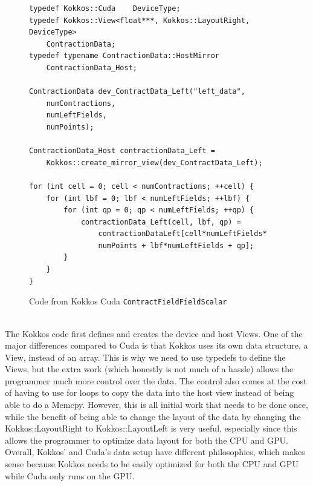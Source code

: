 \begin{figure}[!htb]
	\begin{lstlisting}
typedef Kokkos::Cuda	DeviceType;
typedef Kokkos::View<float***, Kokkos::LayoutRight, DeviceType>
	ContractionData;
typedef typename ContractionData::HostMirror
	ContractionData_Host;

ContractionData dev_ContractData_Left("left_data",
	numContractions,
	numLeftFields,
	numPoints);

ContractionData_Host contractionData_Left = 
	Kokkos::create_mirror_view(dev_ContractData_Left);

for (int cell = 0; cell < numContractions; ++cell) {
	for (int lbf = 0; lbf < numLeftFields; ++lbf) {
		for (int qp = 0; qp < numLeftFields; ++qp) {
			contractionData_Left(cell, lbf, qp) = 
				contractionDataLeft[cell*numLeftFields*
				numPoints + lbf*numLeftFields + qp];
		}
	}
}
	\end{lstlisting}
\caption{Code from Kokkos Cuda \texttt{ContractFieldFieldScalar}
\label{lst:ContractFieldFieldScalar Kokkos Cuda Data Setup}}
\end{figure}
\\
The Kokkos code first defines and creates the device and host Views. One of the major differences compared to Cuda is that Kokkos uses its own data structure, a View, instead of an array. This is why we need to use typedefs to define the Views, but the extra work (which honestly is not much of a hassle) allows the programmer much more control over the data. The control also comes at the cost of having to use for loops to copy the data into the host view instead of being able to do a Memcpy. However, this is all initial work that needs to be done once, while the benefit of being able to change the layout of the data by changing the Kokkos::LayoutRight to Kokkos::LayoutLeft is very useful, especially since this allows the programmer to optimize data layout for both the CPU and GPU. Overall, Kokkos' and Cuda's data setup have different philosophies, which makes sense because Kokkos needs to be easily optimized for both the CPU and GPU while Cuda only runs on the GPU. 

